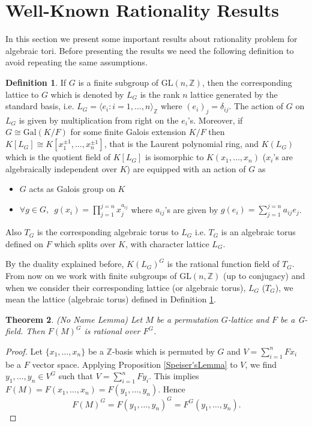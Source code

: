\documentclass[a4paper, 14pt]{extarticle}
\theoremstyle{plain}
\newtheorem{theorem}{Theorem}
\theoremstyle{definition}
\newtheorem{definition}[theorem]{Definition}
\newcommand{\Z}{\ensuremath{\mathbb{Z}}}
\newcommand{\G}{G}
\newcommand{\glat}{$G$-lattice}
\begin{document}
\section{Well-Known Rationality Results}
In this section we present some important results about rationality problem for 
algebraic tori. Before presenting the results we need the following definition 
to avoid repeating the same assumptions.
\begin{definition}\label{Assumption}
If $G$ is a finite subgroup of $\mathrm{GL}(n,\Z)$, then the corresponding lattice 
to $G$ which is denoted by $L_G$ is the rank $n$ lattice generated by the standard 
basis, i.e. $L_G = \langle e_i : i  = 1, \ldots, n \rangle_\Z$ where $(e_i)_j = \delta_{ij}$. 
The action of $G$ on $L_G$ is given by multiplication from right on the $e_i$'s.
 Moreover, if $G \cong \mathrm{Gal}(K/F)$ for some finite Galois extension $K/F$ 
 then $K[L_G] \cong K[x^{\pm 1}_1, \ldots , x^{\pm 1}_n]$, that is the Laurent 
 polynomial ring, and $K(L_G)$ which is the quotient field of $K[L_G]$ is isomorphic 
 to $K(x_1, \ldots , x_n)$ ($x_i$'s are algebraically independent over $K$) are equipped 
 with an action of $G$ as
\begin{itemize}
\item $G$ acts as Galois group on $K$ 
\item $\forall g \in G, \,\,\, g(x_i) = \prod_{j=1}^{j=n} x_j^{a_{ij}}$  where $a_{ij}$'s 
are given by $g(e_i) = \sum_{j=1}^{j=n} a_{ij}e_j$.
\end{itemize}
Also $T_G$ is the corresponding algebraic torus to $L_G$ i.e. $T_G$ is an algebraic 
torus defined on $F$ which splits over $K$, with character lattice $L_G$. 
\end{definition}
\noindent
By the duality explained before, $K(L_G)^G$ is the rational function field of $T_G$. 
From now on we work with finite subgroups of $\mathrm{GL}(n,\Z)$ (up to conjugacy) and 
when we consider their corresponding lattice (or algebraic torus), $L_G$ ($T_G$), we 
mean the lattice (algebraic torus) defined in Definition \ref{Assumption}. 
\label{action}
\begin{theorem}\cite{Speiser}\label{NoNameLemma}
(No Name Lemma) Let $M$ be a permutation \glat \,\,and $F$ be a \G-field. Then $F(M)^\G$ 
is rational over $F^\G$. 
\end{theorem}
\begin{proof}
Let $\lbrace x_1, \ldots , x_n \rbrace$ be a $\Z$-basis which is permuted by $G$ and 
$V = \sum^n_{i=1}Fx_i$ be a $F$ vector space. Applying Proposition \ref{Speiser'sLemma} 
to $V$, we find $y_1, \ldots , y_n \in V^G $ such that $V = \sum^n_{i=1}Fy_i$. This 
implies $F(M) = F(x_1, \ldots, x_n) = F(y_1, \ldots, y_n)$. Hence 
$$F(M)^G = F(y_1, \ldots , y_n)^G = F^G(y_1, \dots, y_n).$$ 
\end{proof}
\end{document}
